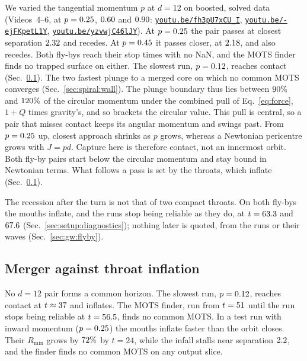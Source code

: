 \documentclass[twocolumn,floatfix,aps,prd,superscriptaddress,nofootinbib,showkeys]{revtex4-2}
\begin{document}
We varied the tangential momentum $p$ at $d=12$ on boosted, solved data (Videos~4--6, at $p=0.25$, $0.60$ and $0.90$: \href{https://youtu.be/fh3pU7xCU_I}{\nolinkurl{youtu.be/fh3pU7xCU_I}}, \href{https://youtu.be/-ejFKpetL1Y}{\nolinkurl{youtu.be/-ejFKpetL1Y}}, \href{https://youtu.be/yzvwjC46lJY}{\nolinkurl{youtu.be/yzvwjC46lJY}}). At $p=0.25$ the pair passes at closest separation $2.32$ and recedes. At $p=0.45$ it passes closer, at $2.18$, and also recedes. Both fly-bys reach their stop times with no NaN, and the MOTS finder finds no trapped surface on either. The slowest run, $p=0.12$, reaches contact (Sec.~\ref{sec:spiral:race}). The two fastest plunge to a merged core on which no common MOTS converges (Sec.~\ref{sec:spiral:wall}). The plunge boundary thus lies between $90\%$ and $120\%$ of the circular momentum under the combined pull of Eq.~\eqref{eq:force}, $1+Q$ times gravity's, and so brackets the circular value. This pull is central, so a pair that misses contact keeps its angular momentum and swings past. From $p=0.25$ up, closest approach shrinks as $p$ grows, whereas a Newtonian pericentre grows with $J=pd$. Capture here is therefore contact, not an innermost orbit. Both fly-by pairs start below the circular momentum and stay bound in Newtonian terms. What follows a pass is set by the throats, which inflate (Sec.~\ref{sec:spiral:race}).

The recession after the turn is not that of two compact throats. On both fly-bys the mouths inflate, and the runs stop being reliable as they do, at $t=63.3$ and $67.6$ (Sec.~\ref{sec:setup:diagnostics}); nothing later is quoted, from the runs or their waves (Sec.~\ref{sec:gw:flyby}).

\subsection{Merger against throat inflation}
\label{sec:spiral:race}

No $d=12$ pair forms a common horizon. The slowest run, $p=0.12$, reaches contact at $t\approx37$ and inflates. The MOTS finder, run from $t=51$ until the run stops being reliable at $t=56.5$, finds no common MOTS. In a test run with inward momentum ($p=0.25$) the mouths inflate faster than the orbit closes. Their $R_{\min}$ grows by $72\%$ by $t=24$, while the infall stalls near separation $2.2$, and the finder finds no common MOTS on any output slice.
\end{document}
